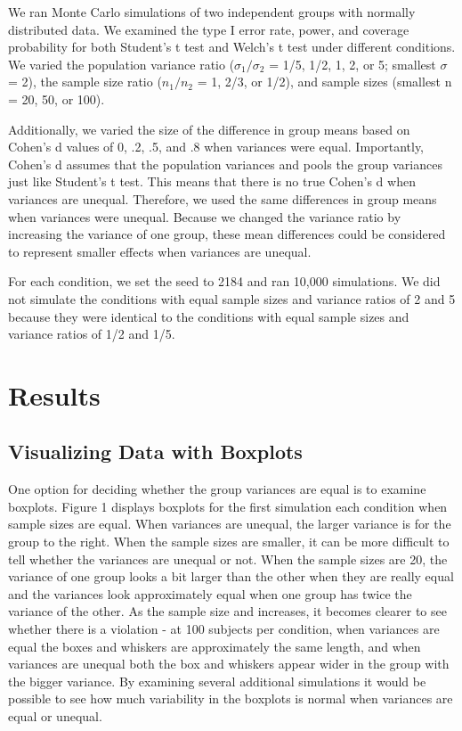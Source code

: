 \documentclass[man,a4paper,noextraspace,apacite]{apa6}\usepackage[]{graphicx}\usepackage[]{color}
\begin{document}
    We ran Monte Carlo simulations of two independent groups with normally distributed data. We examined the type I error rate, power, and coverage probability for both Student's t test and Welch's t test under different conditions. We varied the population variance ratio ($\sigma_{1}/\sigma_{2}$ = 1/5, 1/2, 1, 2, or 5; smallest $\sigma$ = 2), the sample size ratio ($n_{1}/n_{2}$ = 1, 2/3, or 1/2), and sample sizes (smallest n = 20, 50, or 100). 
    
    Additionally, we varied the size of the difference in group means based on Cohen's d values of 0, .2, .5, and .8 when variances were equal. Importantly, Cohen's d assumes that the population variances and pools the group variances just like Student's t test. This means that there is no true Cohen's d when variances are unequal. Therefore, we used the same differences in group means when variances were unequal. Because we changed the variance ratio by increasing the variance of one group, these mean differences could be considered to represent smaller effects when variances are unequal.
    
    For each condition, we set the seed to 2184 and ran 10,000 simulations. We did not simulate the conditions with equal sample sizes and variance ratios of 2 and 5 because they were identical to the conditions with equal sample sizes and variance ratios of 1/2 and 1/5. 

\section{Results}   



\subsection{Visualizing Data with Boxplots} 
One option for deciding whether the group variances are equal is to examine boxplots. Figure 1 displays boxplots for the first simulation each condition when sample sizes are equal. When variances are unequal, the larger variance is for the group to the right. When the sample sizes are smaller, it can be more difficult to tell whether the variances are unequal or not. When the sample sizes are 20, the variance of one group looks a bit larger than the other when they are really equal and the variances look approximately equal when one group has twice the variance of the other. As the sample size and increases, it becomes clearer to see whether there is a violation - at 100 subjects per condition, when variances are equal the boxes and whiskers are approximately the same length, and when variances are unequal both the box and whiskers appear wider in the group with the bigger variance. By examining several additional simulations it would be possible to see how much variability in the boxplots is normal when variances are equal or unequal.
   
\end{document}
